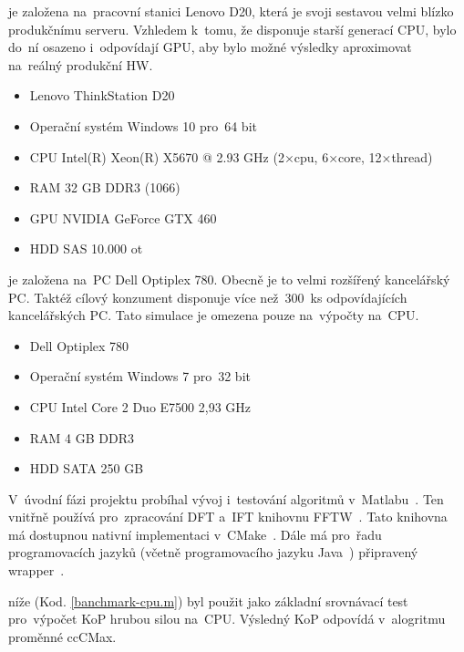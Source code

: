 

je založena na~pracovní stanici Lenovo D20, která je svoji sestavou velmi blízko produkčnímu serveru. Vzhledem k~tomu, že disponuje starší generací CPU, bylo do~ní osazeno i~odpovídají GPU, aby bylo možné výsledky aproximovat na~reálný produkční HW.
\begin{itemize}
	\setlength{\parskip}{0pt}
	\setlength{\itemsep}{0pt}
	\item {Lenovo ThinkStation D20}
	\item {Operační systém Windows 10 pro~64 bit}
    \item {CPU Intel(R) Xeon(R) X5670 @ 2.93 GHz (2×cpu, 6×core, 12×thread)}
    \item {RAM 32 GB DDR3 (1066)}
    \item {GPU NVIDIA GeForce GTX 460}
    \item {HDD SAS 10.000 ot}
\end{itemize}

je založena na~PC Dell Optiplex 780. Obecně je to velmi rozšířený kancelářský PC. Taktéž cílový konzument disponuje více než~300~ks odpovídajících kancelářských PC. Tato simulace je omezena pouze na~výpočty na~CPU.
\begin{itemize}
	\setlength{\parskip}{0pt}
	\setlength{\itemsep}{0pt}
	\item {Dell Optiplex 780}
	\item {Operační systém Windows 7 pro~32 bit}
	\item {CPU Intel Core 2 Duo E7500 2,93 GHz}
	\item {RAM 4 GB DDR3}
	\item {HDD SATA 250 GB}
\end{itemize}

V~úvodní fázi projektu probíhal vývoj i~testování algoritmů v~Matlabu~\cite{matlab}. Ten vnitřně používá pro~zpracování DFT a~IFT knihovnu FFTW~\cite{fftw}. Tato knihovna má dostupnou nativní implementaci v~CMake~\cite{cmake}. Dále má pro~řadu programovacích jazyků (včetně programovacího jazyku Java~\cite{FFT-java}) připravený wrapper~\cite{wrapper}.

níže (Kod. \ref{banchmark-cpu.m}) byl použit jako základní srovnávací test pro~výpočet KoP hrubou silou na~CPU. Výsledný KoP odpovídá v~alogritmu proměnné ccCMax.

